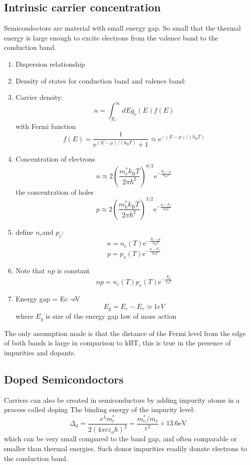 \documentclass[12pt,a4paper]{article}
\begin{document}
\subsection{Intrinsic carrier concentration}
Semicondoctors are material with small energy gap. So small that the thermal energy is large enough to excite electrons from the valence band to the conduction band.
\begin{enumerate}
    \item Dispersion relationship
    \item Density of states for conduction band and valence band:
    \item Carrier density:
    $$
    n=\int_{E_{\mathrm{c}}}^{\infty} d E g_{\mathrm{e}}(E) f(E)
    $$
    with Fermi function
    $$
    f(E)=\frac{1}{\mathrm{e}^{(E-\mu) /\left(k_{\mathrm{B}} T\right)}+1} \approx \mathrm{e}^{-(E-\mu) /\left(k_{\mathrm{B}} T\right)}
    $$
    \item Concentration of electrons$$
    n \approx 2\left(\frac{m_{\mathrm{e}}^* k_{\mathrm{B}} T}{2 \pi \hbar^2}\right)^{0 / 2} \mathrm{e}^{-\frac{E_{\mathrm{c}}-\mu}{k_{\mathrm{B}} T}}
    $$
    the concentration of holes
    $$
    p \approx 2\left(\frac{m_{\mathrm{h}}^* k_{\mathrm{B}} T}{2 \pi \hbar^2}\right)^{3 / 2} \mathrm{e}^{-\frac{\mu-E_{\mathrm{v}}}{k_{\mathrm{B}} T}}
    $$
    \item define $n_c $and $p_c$:
    $$
    n=n_{\mathrm{c}}(T) \mathrm{e}^{-\frac{E_{\mathrm{c}}-\mu}{k_{\mathrm{B}} T}}
    $$ 
    $$
    p=p_{\mathrm{v}}(T) \mathrm{e}^{-\frac{\mu-E_{\mathrm{v}}}{k_{\mathrm{B}} T}}
    $$
    \item Note that $np$ is constant
    $$
    n p=n_{\mathrm{c}}(T) p_{\mathrm{v}}(T) \mathrm{e}^{-\frac{E_g}{k_{\mathrm{B}} T}}
    $$
    \item Energy gap = Ec -eV
    $$
    E_{\mathrm{g}}=E_{\mathrm{c}}-E_{\mathrm{v}} \simeq 1 e V
    $$
    where $E_g$ is size of the energy gap law of mass action
\end{enumerate}
The only assumption made is that the distance of the Fermi level from the edge of both bands is large in comparison to kBT, this is true in the presence of impurities and dopants.
\subsection{Doped Semicondoctors}
Carriers can also be created in semiconductors by adding impurity atoms in a process called doping
The binding energy of the impurity level:
$$
\Delta_{\mathrm{d}}=\frac{e^4 m_{\mathrm{c}}^*}{2\left(4 \pi \varepsilon \varepsilon_o \hbar\right)^2}=\frac{m_{\mathrm{c}}^* / m_{\mathrm{e}}}{\varepsilon^2} \times 13.6 \mathrm{eV}
$$
which can be very small compared to the band gap, and often comparable or smaller than thermal energies. Such donor impurities readily donate electrons to the conduction band.
\end{document}
